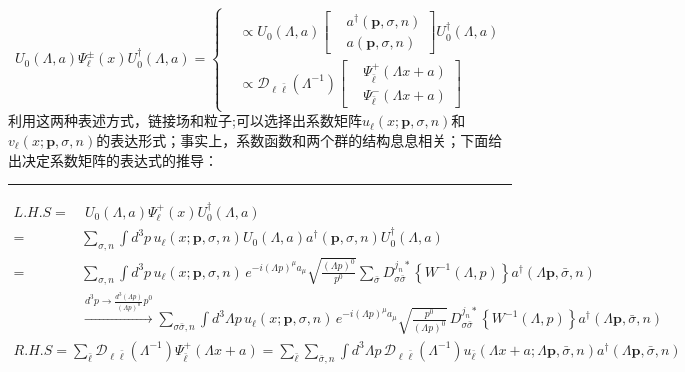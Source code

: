 \begin{equation}
    U_0(\Lambda,a)\Psi^{\pm}_\ell(x)U_0^\dagger(\Lambda,a)
    =\left\{
        \begin{aligned}
            &\varpropto U_0(\Lambda,a)\left[\begin{aligned}
                &a^\dagger(\boldsymbol{p},\sigma,n)\\&a(\boldsymbol{p},\sigma,n)
            \end{aligned}\right] U_0^\dagger(\Lambda,a)\\
            &\varpropto \mathscr{D}_{\ell\bar{\ell}}(\Lambda^{-1})\left[\begin{aligned}
                &\Psi_{\bar{\ell}}^+(\Lambda x+a)\\&\Psi_{\bar{\ell}}^-(\Lambda x+a)
            \end{aligned}\right]
        \end{aligned}
    \right.
\end{equation}
利用这两种表述方式，\color{blue}链接场和粒子\normalcolor;可以选择出系数矩阵$u_\ell(x;\boldsymbol{p},\sigma,n)$和$v_\ell(x;\boldsymbol{p},\sigma,n)$的表达形式；\color{blue}事实上，系数函数和两个群的结构息息相关\normalcolor；下面给出决定系数矩阵的表达式的推导：
\vspace{2ex}
\hrule
\vspace{2ex}
\centerline{}
\[\begin{aligned}
    L.H.S=&\;U_0(\Lambda,a)\Psi^{+}_\ell(x)U_0^\dagger(\Lambda,a)\\
    =&\sum_{\sigma,n}\int d^3p\, u_{\ell}(x;\boldsymbol{p},\sigma,n) U_0(\Lambda,a)a^\dagger(\boldsymbol{p},\sigma,n)U_0^\dagger(\Lambda,a)\\
    =&\sum_{\sigma,n}\int d^3p\, u_{\ell}(x;\boldsymbol{p},\sigma,n)\,e^{-i(\Lambda p)^\mu a_\mu}\sqrt{\frac{(\Lambda p)^0}{p^0}}\sum_{\bar{\sigma}}D_{\sigma \bar{\sigma}}^{j_n*}\left\{W^{-1}(\Lambda,p)\right\}a^\dagger(\Lambda\boldsymbol{p},\bar{\sigma},n)\\
    &\xrightarrow{d^3p\to \frac{d^3(\Lambda p)}{(\Lambda p)^0}p^0}\sum_{\sigma\bar{\sigma},n}\int d^3\Lambda p\, u_{\ell}(x;\boldsymbol{p},\sigma,n)\,e^{-i(\Lambda p)^\mu a_\mu}\sqrt{\frac{p^0}{(\Lambda p)^0}}\,D_{\sigma \bar{\sigma}}^{j_n*}\left\{W^{-1}(\Lambda,p)\right\} a^\dagger(\Lambda\boldsymbol{p},\bar{\sigma},n)
\end{aligned}\]
\[\begin{aligned}
    R.H.S=\sum_{\bar{\ell}}\mathscr{D}_{\ell\bar{\ell}}(\Lambda^{-1})\Psi_{\bar{\ell}}^+(\Lambda x+a)
    =\sum_{\bar{\ell}}\sum_{\bar{\sigma},n}\int d^3\Lambda p\,\mathscr{D}_{\ell\bar{\ell}}(\Lambda^{-1}) u_{\bar{\ell}}(\Lambda x+a;\Lambda \boldsymbol{p},\bar{\sigma},n) a^\dagger(\Lambda \boldsymbol{p},\bar{\sigma},n)
\end{aligned}\]
